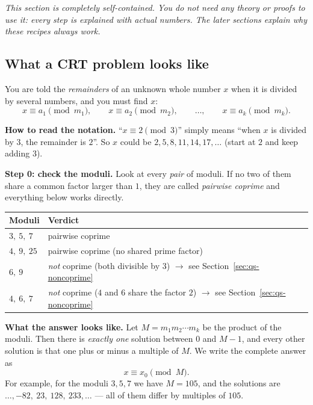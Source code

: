 \documentclass[11pt]{article}
\theoremstyle{definition}
\theoremstyle{remark}
\begin{document}
\noindent\emph{This section is completely self-contained. You do not need any theory or proofs to use it: every step is explained with actual numbers. The later sections explain \emph{why} these recipes always work.}

\subsection{What a CRT problem looks like}

You are told the \emph{remainders} of an unknown whole number $x$ when it is divided by several numbers, and you must find $x$:
\[
x\equiv a_1 \pmod{m_1},\qquad x\equiv a_2 \pmod{m_2},\qquad \dots,\qquad x\equiv a_k \pmod{m_k}.
\]

\textbf{How to read the notation.} ``$x\equiv 2\pmod 3$'' simply means ``when $x$ is divided by $3$, the remainder is $2$''. So $x$ could be $2,5,8,11,14,17,\dots$ (start at $2$ and keep adding $3$).

\textbf{Step 0: check the moduli.} Look at every \emph{pair} of moduli. If no two of them share a common factor larger than $1$, they are called \emph{pairwise coprime} and everything below works directly.
\begin{center}
\begin{tabular}{ll}
\toprule
Moduli & Verdict \\
\midrule
$3,\ 5,\ 7$ & pairwise coprime \\
$4,\ 9,\ 25$ & pairwise coprime (no shared prime factor) \\
$6,\ 9$ & \emph{not} coprime (both divisible by $3$) $\to$ see Section~\ref{sec:qs-noncoprime} \\
$4,\ 6,\ 7$ & \emph{not} coprime ($4$ and $6$ share the factor $2$) $\to$ see Section~\ref{sec:qs-noncoprime} \\
\bottomrule
\end{tabular}
\end{center}

\textbf{What the answer looks like.} Let $M=m_1m_2\cdots m_k$ be the product of the moduli. Then there is \emph{exactly one} solution between $0$ and $M-1$, and every other solution is that one plus or minus a multiple of $M$. We write the complete answer as
\[
x\equiv x_0 \pmod M.
\]
For example, for the moduli $3,5,7$ we have $M=105$, and the solutions are $\dots,-82,\ 23,\ 128,\ 233,\dots$ --- all of them differ by multiples of $105$.
\end{document}
